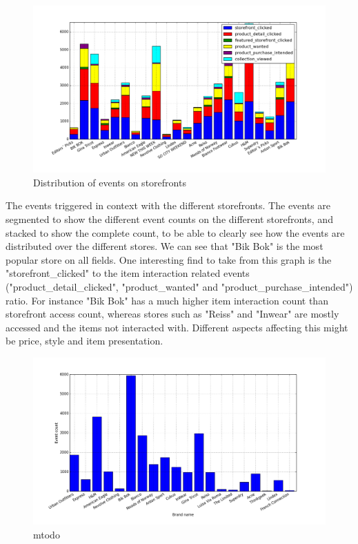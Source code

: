     \begin{figure}[H]
        \includegraphics[width=5in]{image/storefront_nameandEventdistribution.png}
        \centering
        \caption{Distribution of events on storefronts}
    \label{figure:eventOnStoreFrontDist}
    \end{figure}
        The events triggered in context with the different storefronts.
        The events are segmented to show the different event counts on the different storefronts, and stacked to show the complete count, to be able to clearly see how the events are distributed over the different stores.
        We can see that "Bik Bok" is the most popular store on all fields.
        One interesting find to take from this graph is the "storefront\_clicked" to the item interaction related events ("product\_detail\_clicked", "product\_wanted" and "product\_purchase\_intended") ratio.
        For instance "Bik Bok" has a much higher item interaction count than storefront access count, whereas stores such as "Reiss" and "Inwear" are mostly accessed and the items not interacted with.
        Different aspects affecting this might be price, style and item presentation.

    \begin{figure}[H]
        \includegraphics[width=5in]{image/retailer_branddistribution.png}
        \centering
        \caption{mtodo}
    \label{figure:retailerBDist}
    \end{figure}

